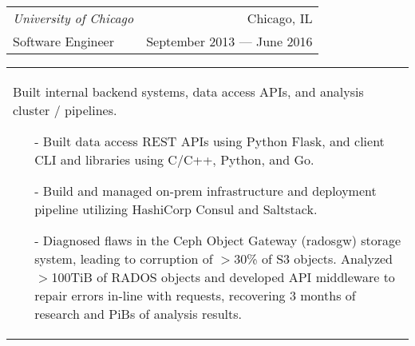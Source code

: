 \begin{tabularx}{\textwidth}{L R}
    \normalsize\textit{University of Chicago} & Chicago, IL \\
    \hspace{10pt}Software Engineer & September 2013 --- June 2016 \\
\end{tabularx}
\begin{tabularx}{\textwidth}{X}
    \hspace{10pt}Built internal backend systems, data access APIs, and analysis cluster / pipelines.
    \begin{itemize}
        \itemsep{}
        \item[-] Built data access REST APIs using Python Flask, and client CLI and libraries using C/C++, Python, and Go.
        \item[-] Build and managed on-prem infrastructure and deployment pipeline utilizing HashiCorp Consul and Saltstack.
        \item[-] Diagnosed flaws in the Ceph Object Gateway (radosgw) storage system, leading to corruption of $>$30\% of S3 objects. Analyzed $>$100TiB of RADOS objects and developed API middleware to repair errors in-line with requests, recovering 3 months of research and PiBs of analysis results.
    \end{itemize}
\end{tabularx}

